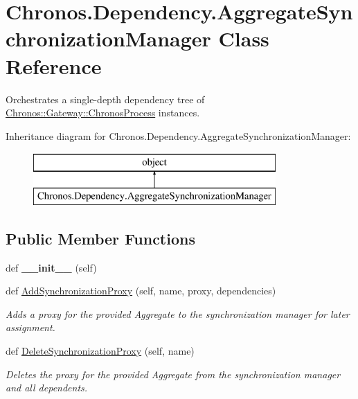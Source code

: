 \hypertarget{classChronos_1_1Dependency_1_1AggregateSynchronizationManager}{}\section{Chronos.\+Dependency.\+Aggregate\+Synchronization\+Manager Class Reference}
\label{classChronos_1_1Dependency_1_1AggregateSynchronizationManager}


Orchestrates a single-\/depth dependency tree of \hyperlink{classChronos_1_1Gateway_1_1ChronosProcess}{Chronos\+::\+Gateway\+::\+Chronos\+Process} instances.  


Inheritance diagram for Chronos.\+Dependency.\+Aggregate\+Synchronization\+Manager\+:\begin{figure}[H]
\begin{center}
\leavevmode
\includegraphics[height=2.000000cm]{classChronos_1_1Dependency_1_1AggregateSynchronizationManager}
\end{center}
\end{figure}
\subsection*{Public Member Functions}
\begin{DoxyCompactItemize}
\item 
def {\bfseries \+\_\+\+\_\+init\+\_\+\+\_\+} (self)
\item 
def \hyperlink{group__Chronos_gafe9e8666dcee9ec3f8e73f3ff92e2ded}{Add\+Synchronization\+Proxy} (self, name, proxy, dependencies)
\begin{DoxyCompactList}\small\item\em Adds a proxy for the provided Aggregate to the synchronization manager for later assignment. \end{DoxyCompactList}\item 
def \hyperlink{group__Chronos_gab57bfb327255df20320cc3e8f9a126c6}{Delete\+Synchronization\+Proxy} (self, name)
\begin{DoxyCompactList}\small\item\em Deletes the proxy for the provided Aggregate from the synchronization manager and all dependents. \end{DoxyCompactList}\end{DoxyCompactItemize}
